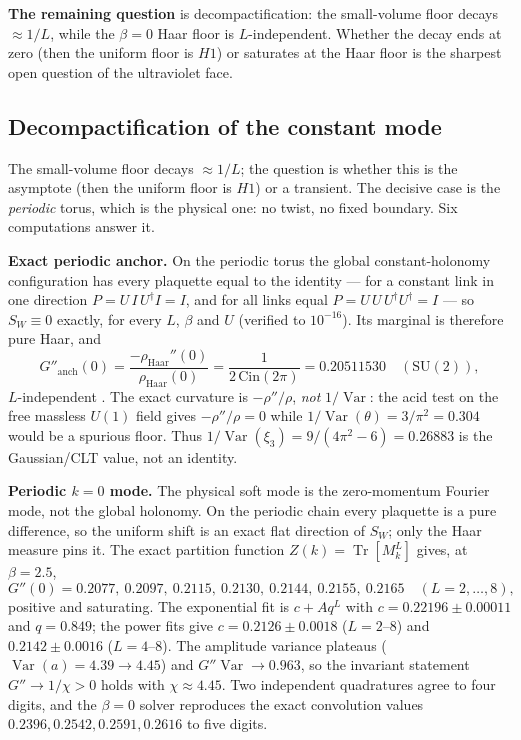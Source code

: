 \documentclass[11pt,a4paper]{article}
\newcommand{\labb}[2]{\fcolorbox{#1!35}{#1!8}{\textcolor{#1}{\textbf{\scriptsize #2}}}}
\newcommand{\LT}{\labb{cT}{T}}
\begin{document}
\textbf{The remaining question} is decompactification: the small-volume floor decays
$\approx1/L$, while the $\beta=0$ Haar floor is $L$-independent. Whether the decay ends at zero
(then the uniform floor is $H1$) or saturates at the Haar floor is the sharpest open question of the
ultraviolet face.

\subsection{Decompactification of the constant mode}
\label{sec:decompact}

The small-volume floor decays $\approx1/L$; the question is whether this is the asymptote (then the
uniform floor is $H1$) or a transient. The decisive case is the \emph{periodic} torus, which is the
physical one: no twist, no fixed boundary. Six computations answer it.

\textbf{Exact periodic anchor.} On the periodic torus the global constant-holonomy configuration has
every plaquette equal to the identity --- for a constant link in one direction $P=U\,I\,U^\dagger I=I$,
and for all links equal $P=U\,U\,U^\dagger U^\dagger=I$ --- so $S_W\equiv0$ exactly, for every $L$,
$\beta$ and $U$ (verified to $10^{-16}$). Its marginal is therefore pure Haar, and
\[
  G''_{\mathrm{anch}}(0)=\frac{-\rho_{\mathrm{Haar}}''(0)}{\rho_{\mathrm{Haar}}(0)}
  =\frac{1}{2\,\mathrm{Cin}(2\pi)}=0.20511530\quad(\mathrm{SU}(2)),
\]
$L$-independent \LT. The exact curvature is $-\rho''/\rho$, \emph{not} $1/\operatorname{Var}$: the
acid test on the free massless $U(1)$ field gives $-\rho''/\rho=0$ while
$1/\operatorname{Var}(\theta)=3/\pi^2=0.304$ would be a spurious floor. Thus
$1/\operatorname{Var}(\xi_3)=9/(4\pi^2-6)=0.26883$ is the Gaussian/CLT value, not an identity.

\textbf{Periodic $k=0$ mode.} The physical soft mode is the zero-momentum Fourier mode, not the
global holonomy. On the periodic chain every plaquette is a pure difference, so the uniform shift is
an exact flat direction of $S_W$; only the Haar measure pins it. The exact partition function
$Z(k)=\operatorname{Tr}[M_k^L]$ gives, at $\beta=2.5$,
\[
  G''(0)=0.2077,\ 0.2097,\ 0.2115,\ 0.2130,\ 0.2144,\ 0.2155,\ 0.2165
  \quad (L=2,\dots,8),
\]
positive and saturating. The exponential fit is $c+Aq^L$ with $c=0.22196\pm0.00011$ and $q=0.849$;
the power fits give $c=0.2126\pm0.0018$ ($L=2$--$8$) and $0.2142\pm0.0016$ ($L=4$--$8$). The
amplitude variance plateaus ($\operatorname{Var}(a)=4.39\to4.45$) and $G''\operatorname{Var}\to0.963$,
so the invariant statement $G''\to1/\chi>0$ holds with $\chi\approx4.45$. Two independent quadratures
agree to four digits, and the $\beta=0$ solver reproduces the exact convolution values
$0.2396,0.2542,0.2591,0.2616$ to five digits.
\end{document}
